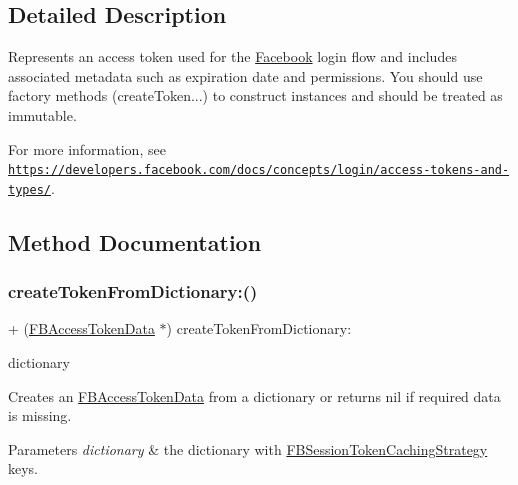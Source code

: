 \subsection{Detailed Description}
Represents an access token used for the \hyperlink{interfaceFacebook}{Facebook} login flow and includes associated metadata such as expiration date and permissions. You should use factory methods (create\+Token...) to construct instances and should be treated as immutable.

For more information, see \href{https://developers.facebook.com/docs/concepts/login/access-tokens-and-types/}{\tt https\+://developers.\+facebook.\+com/docs/concepts/login/access-\/tokens-\/and-\/types/}. 

\subsection{Method Documentation}
\mbox{\label{interfaceFBAccessTokenData_a0a756bdb60ce1b81cd4dbc61943315a9}} 
\subsubsection{\texorpdfstring{create\+Token\+From\+Dictionary\+:()}{createTokenFromDictionary:()}\hspace{0.1cm}{\footnotesize\ttfamily [1/5]}}
{\footnotesize\ttfamily + (\hyperlink{interfaceFBAccessTokenData}{F\+B\+Access\+Token\+Data} $\ast$) create\+Token\+From\+Dictionary\+: \begin{DoxyParamCaption}\item[{(N\+S\+Dictionary $\ast$)}]{dictionary }\end{DoxyParamCaption}}

Creates an \hyperlink{interfaceFBAccessTokenData}{F\+B\+Access\+Token\+Data} from a dictionary or returns nil if required data is missing. 
\begin{DoxyParams}{Parameters}
{\em dictionary} & the dictionary with \hyperlink{interfaceFBSessionTokenCachingStrategy}{F\+B\+Session\+Token\+Caching\+Strategy} keys. \\
\hline
\end{DoxyParams}
\mbox{\label{interfaceFBAccessTokenData_a0a756bdb60ce1b81cd4dbc61943315a9}} 
